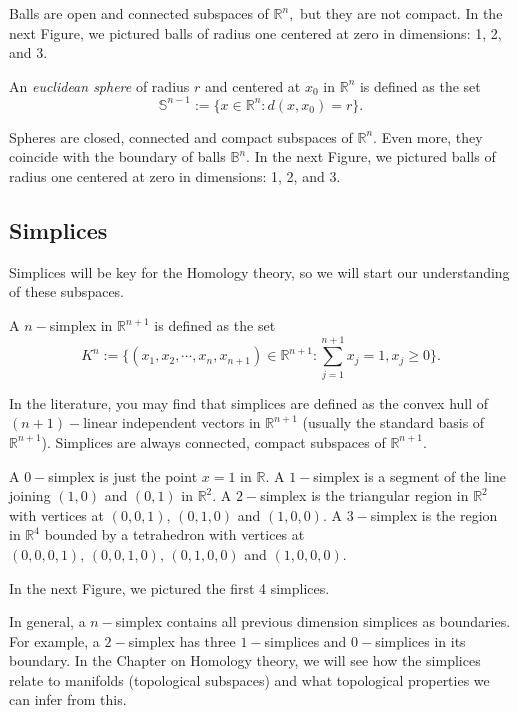 \documentclass[
	fontsize=10pt, %
	twoside=false, %
	secnumdepth=1, %
]{kaobook}
\begin{document}
Balls are open and connected subspaces of $\mathbb{R}^n,$  but they are not compact. In the next Figure, we pictured balls of radius one centered at zero in dimensions: 1, 2, and 3.

\begin{definition}
An \emph{euclidean sphere} of radius $r$ and centered at $x_0$ in $\mathbb{R}^n$ is defined as the set $$\mathbb{S}^{n-1}:=\{x\in\mathbb{R}^n: d(x,x_0)=r\}.$$
\end{definition}

Spheres are closed, connected and compact subspaces of $\mathbb{R}^n.$ Even more, they coincide with the boundary of balls $\mathbb{B}^n.$ In the next Figure, we pictured balls of radius one centered at zero in dimensions: 1, 2, and 3.

\subsection{Simplices}

Simplices will be key for the Homology theory, so we will start our understanding of these subspaces.

\begin{definition}
A $n-$simplex in $\mathbb{R}^{n+1}$ is defined as the set $$K^n:=\{(x_1,x_2,\cdots, x_n,x_{n+1})\in \mathbb{R}^{n+1}: \sum_{j=1}^{n+1} x_j =1, x_j\geq 0\}.$$
\end{definition}

In the literature, you may find that simplices are defined as the convex hull of $(n+1)-$linear independent vectors in $\mathbb{R}^{n+1}$ (usually the standard basis of $\mathbb{R}^{n+1}$). Simplices are always connected, compact subspaces of $\mathbb{R}^{n+1}.$ 

\begin{example}
A $0-$simplex is just the point $x=1$ in $\mathbb{R}.$ A $1-$simplex is a segment of the line joining $(1,0)$ and $(0,1)$ in $\mathbb{R}^2.$ A $2-$simplex is the triangular region in $\mathbb{R}^2$ with vertices at $(0,0,1),\,(0,1,0)$ and $(1,0,0).$ A $3-$simplex is the region in $\mathbb{R}^4$ bounded by a tetrahedron with vertices at $(0,0,0,1),\,(0,0,1,0),\,(0,1,0,0)$ and $(1,0,0,0).$

In the next Figure, we pictured the first 4 simplices.
\end{example}

In general, a $n-$simplex contains all previous dimension simplices as boundaries. For example, a $2-$simplex has three $1-$simplices and $0-$simplices in its boundary. In the Chapter on Homology theory, we will see how the simplices relate to manifolds (topological subspaces) and what topological properties we can infer from this.
\end{document}
